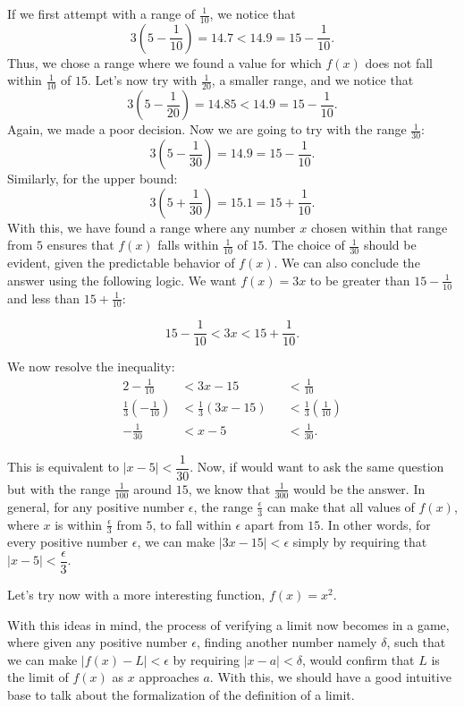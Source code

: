 \documentclass{report}
\begin{document}
If we first attempt with a range of $\frac{1}{10}$, we notice that
$$3\left(5 - \dfrac{1}{10}\right) = 14.7 < 14.9 = 15 - \dfrac{1}{10}.$$
Thus, we chose a range where we found a value for which $f(x)$ does not fall within $\frac{1}{10}$ of $15$. Let's now try with $\frac{1}{20}$, a smaller range, and we notice that
$$3\left(5 - \dfrac{1}{20}\right) = 14.85 < 14.9 = 15 - \dfrac{1}{10}.$$
Again, we made a poor decision. Now we are going to try with the range $\frac{1}{30}$:
$$3\left(5-\dfrac{1}{30}\right) = 14.9 = 15-\dfrac{1}{10}.$$
Similarly, for the upper bound:
$$3\left(5+\dfrac{1}{30}\right) = 15.1 = 15+\dfrac{1}{10}.$$
With this, we have found a range where any number $x$ chosen within that range from $5$ ensures that $f(x)$ falls within $\frac{1}{10}$ of $15$. The choice of $\frac{1}{30}$ should be evident, given the predictable behavior of $f(x)$. We can also conclude the answer using the following logic. We want $f(x) = 3x$ to be greater than $15-\frac{1}{10}$ and less than $15 + \frac{1}{10}$:

$$15-\frac{1}{10} < 3x < 15 + \frac{1}{10}.$$

We now resolve the inequality:
\begin{alignat*}{2}
    -\frac{1}{10} &< 3x - 15 &&< \frac{1}{10} \\
    \frac{1}{3} \left(-\frac{1}{10}\right) &< \frac{1}{3}(3x - 15) &&< \frac{1}{3}\left(\frac{1}{10}\right) \\
    -\frac{1}{30} &< x - 5 &&< \frac{1}{30}.
\end{alignat*}

This is equivalent to $|x-5|<\dfrac{1}{30}$. Now, if would want to ask the same question but with the range $\frac{1}{100}$ around $15$, we know that $\frac{1}{300}$ would be the answer. In general, for any positive number $\epsilon$, the range $\frac{\epsilon}{3}$ can make that all values of $f(x)$, where $x$ is within $\frac{\epsilon}{3}$ from $5$, to fall within $\epsilon$ apart from $15$. In other words, for every positive number $\epsilon$, we can make $|3x-15|< \epsilon$ simply by requiring that $|x-5| < \dfrac{\epsilon}{3}$.

Let's try now with a more interesting function, $f(x) = x^2$. 

With this ideas in mind, the process of verifying a limit now becomes in a game, where given any positive number $\epsilon$, finding another number namely $\delta$, such that we can make $|f(x) - L| < \epsilon$ by requiring $|x-a| < \delta$, would confirm that $L$ is the limit of $f(x)$ as $x$ approaches $a$. With this, we should have a good intuitive base to talk about the formalization of the definition of a limit.
\end{document}

